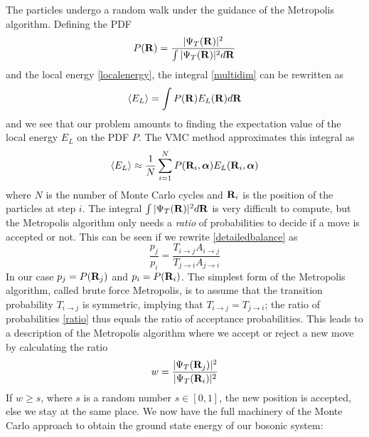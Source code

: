 \documentclass[english, a4paper]{article}
\begin{document}
\noindent The particles undergo a random walk under the guidance of the Metropolis algorithm. 
Defining the PDF 
\begin{equation}
 P({\bf R}) = \frac{|\Psi_T({\bf R})|^2}{\int |\Psi_T({\bf R})|^2 d{\bf R}}
\end{equation}
and the local energy \eqref{localenergy}, the integral \eqref{multidim} can be rewritten as
\begin{equation}
 \langle E_L \rangle = \int P({\bf R}) E_L({\bf R}) d{\bf R}
\end{equation}
and we see that our problem amounts to finding the expectation value of the local energy $E_L$ on the PDF $P$.
The VMC method approximates this integral as
\begin{equation}
 \langle E_L \rangle \approx \frac{1}{N} \sum_{i=1}^N P({\bf R}_i, \boldsymbol{\alpha}) E_L({\bf R}_i, \boldsymbol{\alpha})
\end{equation}
where $N$ is the number of Monte Carlo cycles and ${\bf R}_i$ is the position of the particles at step $i$. 
The integral $\int |\Psi_T({\bf R})|^2 d{\bf R}$ is very difficult to compute, but the Metropolis algorithm only needs
a \textit{ratio} of probabilities to decide if a move is accepted or not. This can be seen if we rewrite 
\eqref{detailedbalance} as
\begin{equation}
 \frac{p_j}{p_i} = \frac{T_{i\rightarrow j} A_{i\rightarrow j}}{T_{j\rightarrow i} A_{j\rightarrow i}}
 \label{ratio}
\end{equation}
In our case $p_j = P({\bf R}_j)$ and $p_i = P({\bf R}_i)$. 
The simplest form of the Metropolis algorithm, called brute force Metropolis, is to assume that
the transition probability $T_{i\rightarrow j}$ is symmetric, implying that $T_{i\rightarrow j} = T_{j\rightarrow i}$;
the ratio of probabilities \eqref{ratio} thus equals the ratio of acceptance probabilities. 
This leads to a  description of the Metropolis algorithm where we accept or reject a new 
move by calculating the ratio 
\begin{equation}
 w = \frac{|\Psi_T({\bf R}_j)|^2}{|\Psi_T({\bf R}_i)|^2}
 \label{ratio2}
\end{equation}
If $w \geq s$, where $s$ is a random number $s \in [0,1]$, the new position is accepted, else we stay
at the same place.
We now have the full machinery of the Monte Carlo approach to obtain the ground state energy of our bosonic system:
\end{document}
